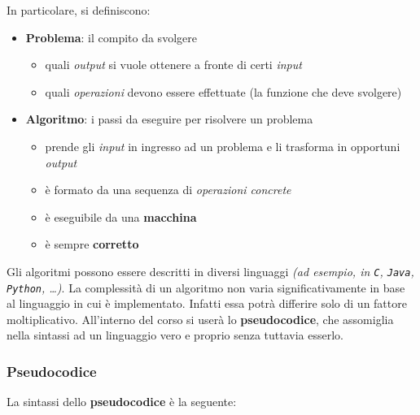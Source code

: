 \documentclass[italian, 10pt]{article}
\begin{document}
In particolare, si definiscono:

\begin{itemize}
  \item \textbf{Problema}: il compito da svolgere
        \begin{itemize}
          \item quali \textit{output} si vuole ottenere a fronte di certi \textit{input}
          \item quali \textit{operazioni} devono essere effettuate (la funzione che deve svolgere)
        \end{itemize}
  \item \textbf{Algoritmo}: i passi da eseguire per risolvere un problema
        \begin{itemize}
          \item prende gli \textit{input} in ingresso ad un problema e li trasforma in opportuni \textit{output}
          \item è formato da una sequenza di \textit{operazioni concrete}
          \item è eseguibile da una \textbf{macchina}
          \item è sempre \textbf{corretto}
        \end{itemize}
\end{itemize}

Gli algoritmi possono essere descritti in diversi linguaggi \textit{(ad esempio, in \texttt{C}, \texttt{Java}, \texttt{Python}, \ldots)}.
La complessità di un algoritmo non varia significativamente in base al linguaggio in cui è implementato.
Infatti essa potrà differire solo di un fattore moltiplicativo.
All'interno del corso si userà lo \textbf{pseudocodice}, che assomiglia nella sintassi ad un linguaggio vero e proprio senza tuttavia esserlo.

\subsubsection{Pseudocodice}

La sintassi dello \textbf{pseudocodice} è la seguente:
\end{document}

